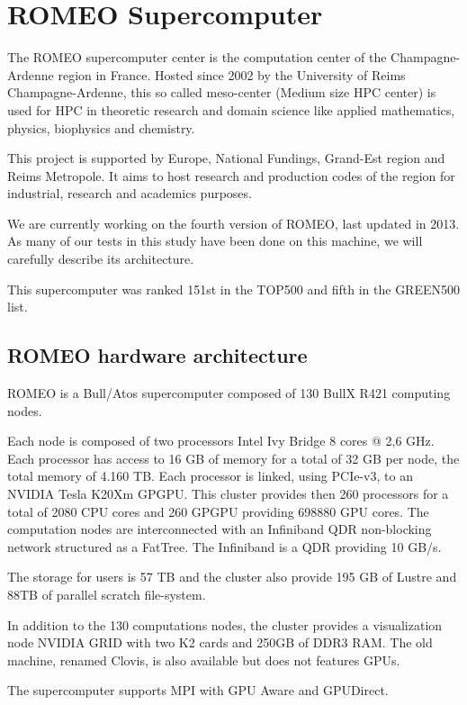 \section{ROMEO Supercomputer}
The ROMEO supercomputer center is the computation center of the Champagne-Ardenne region in France. 
Hosted since 2002 by the University of Reims Champagne-Ardenne, this so called meso-center (Medium size HPC center) is used for HPC in theoretic research and domain science like applied mathematics, physics, biophysics and chemistry. 

This project is supported by Europe, National Fundings, Grand-Est region and Reims Metropole. 
It aims to host research and production codes of the region for industrial, research and academics purposes. 

We are currently working on the fourth version of ROMEO, last updated in 2013. 
As many of our tests in this study have been done on this machine, we will carefully describe its architecture. 

This supercomputer was ranked 151st in the TOP500 and fifth in the GREEN500 list. 

\subsection{ROMEO hardware architecture}
\label{sec:part1_ROMEO}
ROMEO is a Bull/Atos supercomputer composed of 130 BullX R421 computing nodes. 

Each node is composed of two processors Intel Ivy Bridge 8 cores @ 2,6 GHz. 
Each processor has access to 16 GB of memory for a total of 32 GB per node, the total memory of 4.160 TB. 
Each processor is linked, using PCIe-v3, to an NVIDIA Tesla K20Xm GPGPU. 
This cluster provides then 260 processors for a total of 2080 CPU cores and 260 GPGPU providing 698880 GPU cores. 
The computation nodes are interconnected with an Infiniband QDR non-blocking network structured as a FatTree. 
The Infiniband is a QDR providing 10 GB/s. 

The storage for users is 57 TB and the cluster also provide 195 GB of Lustre and 88TB of parallel scratch file-system. 

In addition to the 130 computations nodes, the cluster provides a visualization node NVIDIA GRID with two K2 cards and 250GB of DDR3 RAM. 
The old machine, renamed Clovis, is also available but does not features GPUs. 

The supercomputer supports MPI with GPU Aware and GPUDirect. 

